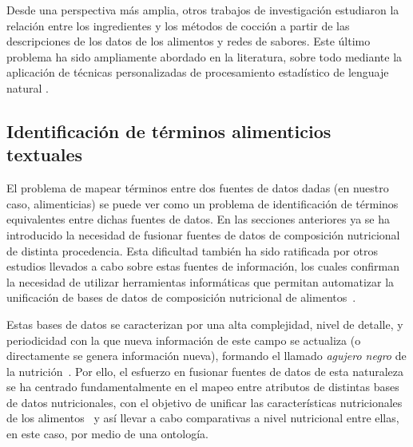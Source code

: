 Desde una perspectiva más amplia, otros trabajos de investigación estudiaron la relación entre los ingredientes y los métodos de cocción a partir de las descripciones de los datos de los alimentos y redes de sabores. Este último problema ha sido ampliamente abordado en la literatura, sobre todo mediante la aplicación de técnicas personalizadas de procesamiento estadístico de lenguaje natural \cite{Takahashi2012,Chen2017,chang2018recipescape}.

\subsection{Identificación de términos alimenticios textuales}

El problema de mapear términos entre dos fuentes de datos dadas (en nuestro caso, alimenticias) se puede ver como un problema de identificación de términos equivalentes entre dichas fuentes de datos. En las secciones anteriores ya se ha introducido la necesidad de fusionar fuentes de datos de composición nutricional de distinta procedencia. Esta dificultad también ha sido ratificada por otros estudios llevados a cabo sobre estas fuentes de información, los cuales confirman la necesidad de utilizar herramientas informáticas que permitan automatizar la unificación de bases de datos de composición nutricional de alimentos~\cite{barabasi2019unmapped}.

Estas bases de datos se caracterizan por una alta complejidad, nivel de detalle, y periodicidad con la que nueva información de este campo se actualiza (o directamente se genera información nueva), formando el llamado \textit{agujero negro} de la nutrición~\cite{barabasi2019unmapped}. Por ello, el esfuerzo en fusionar fuentes de datos de esta naturaleza se ha centrado fundamentalmente en el mapeo entre atributos de distintas bases de datos nutricionales, con el objetivo de unificar las características nutricionales de los alimentos~\cite{ispirovaG} y así llevar a cabo comparativas a nivel nutricional entre ellas, en este caso, por medio de una ontología.

